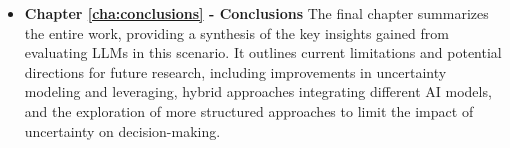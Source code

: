 \begin{itemize}
  \item \textbf{Chapter \ref{cha:conclusions} - Conclusions} The final chapter
    summarizes the entire work, providing a synthesis of the key insights gained
    from evaluating LLMs in this scenario. It outlines current limitations and
    potential directions for future research, including improvements in uncertainty
    modeling and leveraging, hybrid approaches integrating different AI models, and
    the exploration of more structured approaches to limit the impact of uncertainty
    on decision-making.
\end{itemize}